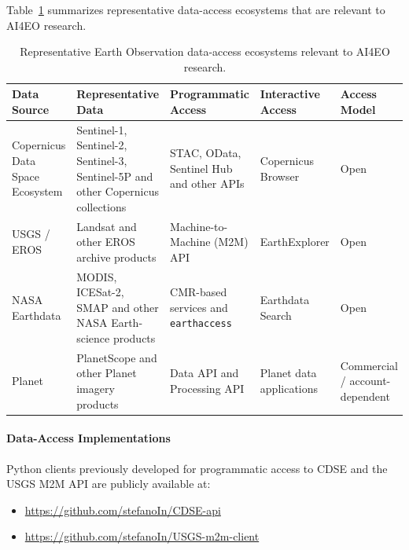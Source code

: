 \documentclass[11pt,a4paper]{article}
\begin{document}
Table~\ref{tab:eo-data-access} summarizes representative data-access
ecosystems that are relevant to AI4EO research.

\begin{table}[htbp]
    \centering
    \small
    \begin{tabular}{
        p{}
        p{}
        p{}
        p{}
        p{}}
        \toprule
        \textbf{Data Source} &
        \textbf{Representative Data} &
        \textbf{Programmatic Access} &
        \textbf{Interactive Access} &
        \textbf{Access Model} \\
        \midrule

        Copernicus Data Space Ecosystem &
        Sentinel-1, Sentinel-2, Sentinel-3, Sentinel-5P and other Copernicus collections &
        STAC, OData, Sentinel Hub and other APIs &
        Copernicus Browser &
        Open \\

        USGS / EROS &
        Landsat and other EROS archive products &
        Machine-to-Machine (M2M) API &
        EarthExplorer &
        Open \\

        NASA Earthdata &
        MODIS, ICESat-2, SMAP and other NASA Earth-science products &
        CMR-based services and \texttt{earthaccess} &
        Earthdata Search &
        Open \\

        Planet &
        PlanetScope and other Planet imagery products &
        Data API and Processing API &
        Planet data applications &
        Commercial / account-dependent \\

        \bottomrule
    \end{tabular}
    \caption{Representative Earth Observation data-access ecosystems relevant to AI4EO research.}
    \label{tab:eo-data-access}
\end{table}

\paragraph{Data-Access Implementations}

Python clients previously developed for programmatic access
to CDSE and the USGS M2M API are publicly available at:

\begin{itemize}
    \item \url{https://github.com/stefanoIn/CDSE-api}
    \item \url{https://github.com/stefanoIn/USGS-m2m-client}
\end{itemize}
\end{document}
